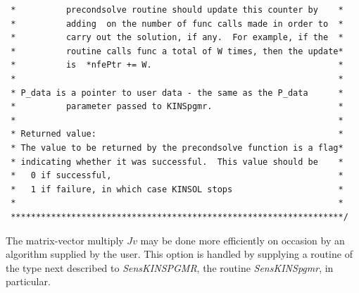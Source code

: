\documentclass[11pt]{article}
\begin{document}
\begin{verbatim}
 *          precondsolve routine should update this counter by    *
 *          adding  on the number of func calls made in order to  *
 *          carry out the solution, if any.  For example, if the  *
 *          routine calls func a total of W times, then the update*
 *          is  *nfePtr += W.                                     *
 *                                                                *
 * P_data is a pointer to user data - the same as the P_data      *
 *          parameter passed to KINSpgmr.                         *
 *                                                                *
 * Returned value:                                                *
 * The value to be returned by the precondsolve function is a flag*
 * indicating whether it was successful.  This value should be    *
 *   0 if successful,                                             *
 *   1 if failure, in which case KINSOL stops                     *
 *                                                                *
 ******************************************************************/

\end{verbatim}
\normalsize

The matrix-vector multiply $J v$ may be done more efficiently on
occasion by an algorithm supplied by the user. This option is handled
by supplying a routine of the type next described to {\em
SensKINSPGMR}, the routine {\em SensKINSpgmr}, in particular.
\end{document}
